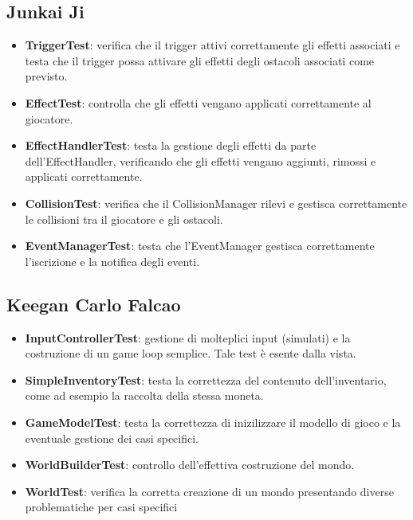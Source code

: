 \documentclass[a4paper,12pt]{report}
\begin{document}
	\subsection{Junkai Ji}
	\begin{itemize}
		\item \textbf{TriggerTest}: verifica che il trigger attivi correttamente gli effetti associati e testa che il trigger possa attivare gli effetti degli ostacoli associati come previsto.
		
		\item \textbf{EffectTest}: controlla che gli effetti vengano applicati correttamente al giocatore.
		
		\item \textbf{EffectHandlerTest}: testa la gestione degli effetti da parte dell’EffectHandler, verificando che gli effetti vengano aggiunti, rimossi e applicati correttamente.
		
		\item \textbf{CollisionTest}: verifica che il CollisionManager rilevi e gestisca correttamente le collisioni tra il giocatore e gli ostacoli.
		
		\item \textbf{EventManagerTest}: testa che l’EventManager gestisca correttamente l’iscrizione e la notifica degli eventi.
	\end{itemize}
	
	\subsection{Keegan Carlo Falcao}
	
	\begin{itemize}
		\item \textbf{InputControllerTest}: gestione di molteplici input (simulati) e la costruzione di un game loop semplice. Tale test è esente dalla vista.
		
		\item \textbf{SimpleInventoryTest}: testa la correttezza del contenuto dell'inventario, come ad esempio la raccolta della stessa moneta.
		
		\item \textbf{GameModelTest}: testa la correttezza di inizilizzare il modello di gioco e la eventuale gestione dei casi specifici.
		
		\item \textbf{WorldBuilderTest}: controllo dell'effettiva costruzione del mondo.
		
		\item \textbf{WorldTest}: verifica la corretta creazione di un mondo presentando diverse problematiche per casi specifici
	\end{itemize}
	
\end{document}
